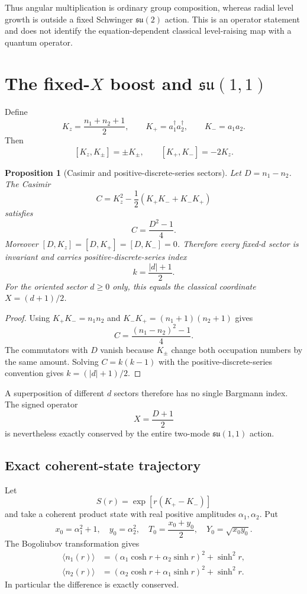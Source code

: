 \documentclass[11pt]{amsart}
\newtheorem{proposition}[theorem]{Proposition}
\theoremstyle{remark}
\begin{document}
Thus angular multiplication is ordinary group composition, whereas radial level growth is outside a fixed Schwinger $\mathfrak{su}(2)$ action.  This is an operator statement and does not identify the equation-dependent classical level-raising map with a quantum operator.

\section{The fixed-$X$ boost and $\mathfrak{su}(1,1)$}
Define
\[
K_z=\frac{n_1+n_2+1}{2},\qquad K_+=a_1^\dagger a_2^\dagger,\qquad K_-=a_1a_2.
\]
Then
\[
[K_z,K_\pm]=\pm K_\pm,\qquad [K_+,K_-]=-2K_z.
\]

\begin{proposition}[Casimir and positive-discrete-series sectors]\label{prop:su11}
Let $D=n_1-n_2$.  The Casimir
\[
C=K_z^2-\frac12(K_+K_-+K_-K_+)
\]
satisfies
\[
C=\frac{D^2-1}{4}.
\]
Moreover $[D,K_z]=[D,K_+]=[D,K_-]=0$.  Therefore every fixed-$d$ sector is invariant and carries positive-discrete-series index
\[
\boxed{k=\frac{|d|+1}{2}}.
\]
For the oriented sector $d\ge0$ only, this equals the classical coordinate $X=(d+1)/2$.
\end{proposition}
\begin{proof}
Using $K_+K_-=n_1n_2$ and $K_-K_+=(n_1+1)(n_2+1)$ gives
\[
C=\frac{(n_1-n_2)^2-1}{4}.
\]
The commutators with $D$ vanish because $K_\pm$ change both occupation numbers by the same amount.  Solving $C=k(k-1)$ with the positive-discrete-series convention gives $k=(|d|+1)/2$.
\end{proof}

A superposition of different $d$ sectors therefore has no single Bargmann index.  The signed operator
\[
X=\frac{D+1}{2}
\]
is nevertheless exactly conserved by the entire two-mode $\mathfrak{su}(1,1)$ action.

\subsection{Exact coherent-state trajectory}
Let
\[
S(r)=\exp[r(K_+-K_-)]
\]
and take a coherent product state with real positive amplitudes $\alpha_1,\alpha_2$.  Put
\[
x_0=\alpha_1^2+1,\quad y_0=\alpha_2^2,\quad T_0=\frac{x_0+y_0}{2},\quad Y_0=\sqrt{x_0y_0}.
\]
The Bogoliubov transformation gives
\begin{align}
\langle n_1(r)\rangle&=(\alpha_1\cosh r+\alpha_2\sinh r)^2+\sinh^2r,\\
\langle n_2(r)\rangle&=(\alpha_2\cosh r+\alpha_1\sinh r)^2+\sinh^2r.
\end{align}
In particular the difference is exactly conserved.
\end{document}
